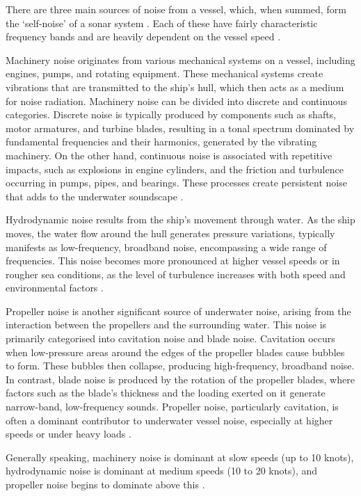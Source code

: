 There are three main sources of noise from a vessel, which, when summed, form the `self-noise' of a sonar system \cite{ross_mechanics_1976}. Each of these have fairly characteristic frequency bands and are heavily dependent on the vessel speed \cite{zak_ships_2008}. 

Machinery noise originates from various mechanical systems on a vessel, including engines, pumps, and rotating equipment. These mechanical systems create vibrations that are transmitted to the ship’s hull, which then acts as a medium for noise radiation. Machinery noise can be divided into discrete and continuous categories. Discrete noise is typically produced by components such as shafts, motor armatures, and turbine blades, resulting in a tonal spectrum dominated by fundamental frequencies and their harmonics, generated by the vibrating machinery. On the other hand, continuous noise is associated with repetitive impacts, such as explosions in engine cylinders, and the friction and turbulence occurring in pumps, pipes, and bearings. These processes create persistent noise that adds to the underwater soundscape \cite{zak_ships_2008, chin-hsing_classification_1998}.

Hydrodynamic noise results from the ship's movement through water. As the ship moves, the water flow around the hull generates pressure variations, typically manifests as low-frequency, broadband noise, encompassing a wide range of frequencies. This noise becomes more pronounced at higher vessel speeds or in rougher sea conditions, as the level of turbulence increases with both speed and environmental factors \cite{bjorno_applied_2017}.

Propeller noise is another significant source of underwater noise, arising from the interaction between the propellers and the surrounding water. This noise is primarily categorised into cavitation noise and blade noise. Cavitation occurs when low-pressure areas around the edges of the propeller blades cause bubbles to form. These bubbles then collapse, producing high-frequency, broadband noise. In contrast, blade noise is produced by the rotation of the propeller blades, where factors such as the blade’s thickness and the loading exerted on it generate narrow-band, low-frequency sounds. Propeller noise, particularly cavitation, is often a dominant contributor to underwater vessel noise, especially at higher speeds or under heavy loads \cite{malinowski_underwater_2001}.

Generally speaking, machinery noise is dominant at slow speeds (up to 10 knots), hydrodynamic noise is dominant at medium speeds (10 to 20 knots), and propeller noise begins to dominate above this \cite{waite_sonar_2002}. 

